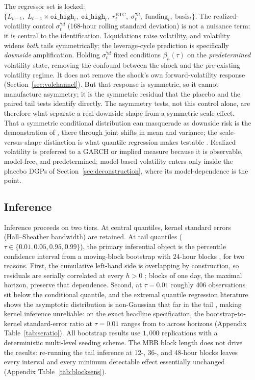 The regressor set is locked:
$\{L_{t-1},\; L_{t-1}\times\texttt{oi\_high}_t,\; \texttt{oi\_high}_t,\;
r^{\text{BTC}}_t,\; \sigma^{7d}_t,\; \text{funding}_t,\; \text{basis}_t\}$.
The realized-volatility control $\sigma^{7d}_t$ (168-hour rolling standard
deviation) is not a nuisance term: it is central to the identification.
Liquidations raise volatility, and volatility widens \emph{both}
tails symmetrically; the leverage-cycle prediction is specifically
\emph{downside} amplification. Holding $\sigma^{7d}_t$ fixed conditions
$\beta_h(\tau)$ on the \emph{predetermined} volatility state, removing the
confound between the shock and the pre-existing volatility regime. It does
not remove the shock's own forward-volatility response
(Section~\ref{sec:volchannel}). But that response is symmetric, so it cannot
manufacture asymmetry; it is the symmetric residual that the placebo and
the paired tail tests identify directly. The asymmetry tests, not this
control alone, are therefore what separate a real downside shape from a
symmetric scale effect. That a symmetric conditional distribution can
masquerade as downside risk is the demonstration of \citet{carriero2024},
there through joint shifts in mean and variance; the scale-versus-shape
distinction is what quantile regression makes testable
\citep{koenker1982,machado2000}. Realized volatility is preferred to a
GARCH or implied measure because it is observable, model-free, and
predetermined; model-based volatility enters only inside the placebo DGPs
of Section~\ref{sec:deconstruction}, where its model-dependence is the
point.

\subsection{Inference}
\label{sec:method-inference}

Inference proceeds on two tiers. At central quantiles, kernel standard
errors (Hall--Sheather bandwidth) are retained. At tail quantiles
($\tau \in \{0.01, 0.05, 0.95, 0.99\}$), the primary inferential object is
the percentile confidence interval from a moving-block bootstrap with
24-hour blocks \citep{fitzenberger1998,politis1994,gregory2018}, for two
reasons. First, the cumulative left-hand side is overlapping by
construction, so residuals are serially correlated at every $h > 0$
\citep{montiel2021,lusompa2023}; blocks of one day, the maximal horizon,
preserve that dependence. Second, at $\tau = 0.01$ roughly 406
observations sit below the conditional quantile, and the extremal quantile
regression literature shows the asymptotic distribution is non-Gaussian
that far in the tail \citep{chernozhukov2005,chernozhukov2011}, making
kernel inference unreliable: on the exact headline specification, the
bootstrap-to-kernel standard-error ratio at $\tau = 0.01$ ranges from
\SeRatioMin{} to \SeRatioMax{} across horizons
(Appendix Table~\ref{tab:seratio}). All bootstrap results use $1{,}000$
replications with a deterministic multi-level seeding scheme. The MBB block
length does not drive the results: re-running the tail inference at 12-, 36-, and
48-hour blocks leaves every interval and every minimum detectable effect
essentially unchanged (Appendix Table~\ref{tab:blocksens}).

